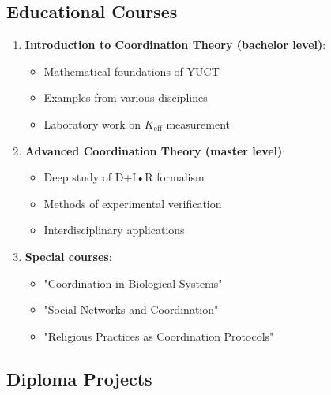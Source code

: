 \documentclass[12pt,a4paper]{article}
\begin{document}
	\subsection{Educational Courses}
	
	\begin{enumerate}
		\item \textbf{Introduction to Coordination Theory (bachelor level)}:
		\begin{itemize}
			\item Mathematical foundations of YUCT
			\item Examples from various disciplines
			\item Laboratory work on $K_{\mathrm{eff}}$ measurement
		\end{itemize}
		
		\item \textbf{Advanced Coordination Theory (master level)}:
		\begin{itemize}
			\item Deep study of D+I•R formalism
			\item Methods of experimental verification
			\item Interdisciplinary applications
		\end{itemize}
		
		\item \textbf{Special courses}:
		\begin{itemize}
			\item "Coordination in Biological Systems"
			\item "Social Networks and Coordination"
			\item "Religious Practices as Coordination Protocols"
		\end{itemize}
	\end{enumerate}
	
	\subsection{Diploma Projects}
	
\end{document}
